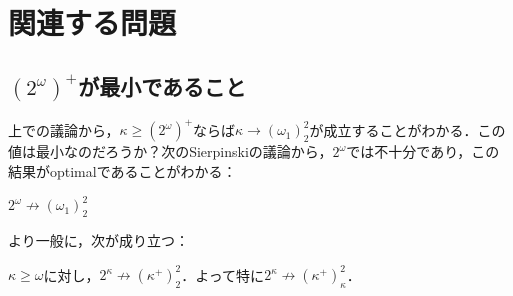 \documentclass[a4paper]{bxjsarticle}
\begin{document}
\section{関連する問題}
\subsection{$(2^\omega)^+$が最小であること}
上での議論から，$\kappa \geq (2^\omega)^+$ならば$\kappa \longrightarrow (\omega_1)^2_2$が成立することがわかる．この値は最小なのだろうか？次のSierpinskiの議論から，$2^\omega$では不十分であり，この結果がoptimalであることがわかる：
\begin{lemma}[Sierpinski]
 $2^\omega \nrightarrow (\omega_1)^2_2$
\end{lemma}
より一般に，次が成り立つ：
\begin{lemma}[Sierpinski]
 $\kappa \geq \omega$に対し，$2^\kappa \nrightarrow (\kappa^+)^2_2$．よって特に$2^\kappa \nrightarrow (\kappa^+)^2_\kappa$．
\end{lemma}
\end{document}
